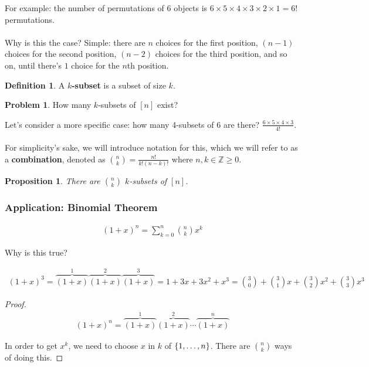 \documentclass[]{article}
\newtheorem*{proposition}{Proposition}
\theoremstyle{definition}
\newtheorem{problem}{Problem}[section]
\newtheorem*{defn}{Definition}
\newcommand{\lecture}[1]{\marginpar{{\footnotesize $\leftarrow$ \underline{#1}}}}
\DeclarePairedDelimiter{\set}{\lbrace}{\rbrace}
\begin{document}
				For example: the number of permutations of $6$ objects is $6 \times 5 \times 4 \times 3 \times 2 \times 1 = 6!$ permutations.
				\\ \\
				Why is this the case? Simple: there are $n$ choices for the first position, $(n - 1)$ choices for the second position, $(n - 2)$ choices for the third position, and so on, until there's $1$ choice for the $n$th position.

				\begin{defn}
					A \textbf{$k$-subset} is a subset of size $k$.
				\end{defn}

				\begin{problem}
					How many $k$-subsets of $[n]$ exist?
				\end{problem}

				Let's consider a more specific case: how many 4-subsets of 6 are there? $\frac{6 \times 5 \times 4 \times 3}{4!}$.
				\\ \\
				For simplicity's sake, we will introduce notation for this, which we will refer to as a \textbf{combination}, denoted as 
					$\binom{n}{k} = \frac{n!}{k!(n-k)!}$ where $n, k \in \mathbb{Z} \ge 0$.
				
				\begin{proposition}
					There are $\binom{n}{k}$ $k$-subsets of $[n]$.
				\end{proposition}
				
				\subsubsection{Application: Binomial Theorem} \lecture{January 9, 2013}
					\begin{align*}
						(1 + x)^n = \sum_{k = 0}^{n} \binom{n}{k} x^k
					\end{align*}
					
					Why is this true?
					
					\begin{align*}
						(1 + x)^3 = \overbrace{(1 + x)}^1\overbrace{(1 + x)}^2\overbrace{(1 + x)}^3 = 1 + 3x + 3x^2 + x^3 = \binom{3}{0} + \binom{3}{1}x + \binom{3}{2}x^2 + \binom{3}{3}x^3
					\end{align*}
					
					\begin{proof}
						\begin{align*}
							(1 + x)^n = \overbrace{(1 + x)}^1 \overbrace{(1 + x)}^2 \cdots \overbrace{(1 + x)}^n
						\end{align*}
						
						In order to get $x^k$, we need to choose $x$ in $k$ of $\set{1, \ldots, n }$. There are $\binom{n}{k}$ ways of doing this.
					\end{proof}
		
\end{document}
